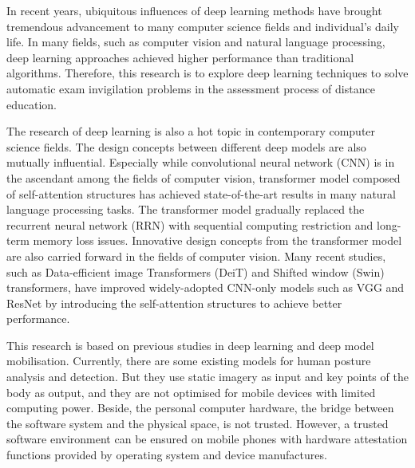 In recent years, ubiquitous influences of deep learning methods have brought tremendous advancement to many computer science fields and individual's daily life. 
In many fields, such as computer vision and natural language processing, deep learning approaches achieved higher performance than traditional algorithms.
Therefore, this research is to explore deep learning techniques to solve automatic exam invigilation problems in the assessment process of distance education.

The research of deep learning is also a hot topic in contemporary computer science fields.
The design concepts between different deep models are also mutually influential.
Especially while convolutional neural network (CNN) is in the ascendant among the fields of computer vision, transformer model composed of self-attention structures has achieved state-of-the-art results in many natural language processing tasks.
The transformer model gradually replaced the recurrent neural network (RRN) with sequential computing restriction and long-term memory loss issues.
Innovative design concepts from the transformer model are also carried forward in the fields of computer vision.
Many recent studies, such as Data-efficient image Transformers (DeiT) and Shifted window (Swin) transformers, have improved widely-adopted CNN-only models such as VGG and ResNet by introducing the self-attention structures to achieve better performance.

This research is based on previous studies in deep learning and deep model mobilisation.
Currently, there are some existing models for human posture analysis and detection.
But they use static imagery as input and key points of the body as output, and they are not optimised for mobile devices with limited computing power.
Beside, the personal computer hardware, the bridge between the software system and the physical space, is not trusted.
However, a trusted software environment can be ensured on mobile phones with hardware attestation functions provided by operating system and device manufactures.
